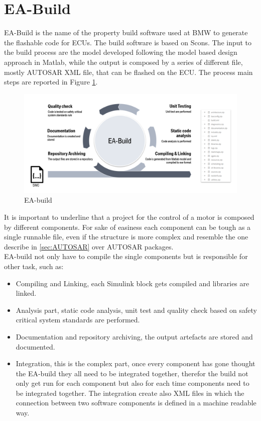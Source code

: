 \documentclass[../main.tex]{subfiles}
\begin{document}
\section{EA-Build}
\label{sec:EA-buildsection}
EA-Build is the name of the property build software used at BMW to generate the flashable code for ECUs. The build software is based on Scons. The input to the build process are the model developed following the model based design approach in Matlab, while the output is composed by a series of different file, mostly \gls{AUTOSAR} XML file, that can be flashed on the \gls{ECU}. The process main steps are reported in Figure \ref{fig:eabuild}.
\begin{figure}[h]
    \centering
    \includegraphics[width=\linewidth]{images_folder/build_proc.png}
    \caption{EA-build}
    \label{fig:eabuild}
\end{figure}
It is important to underline that a project for the control of a motor is composed by different components. For sake of easiness each component can be tough as a single runnable file, even if the structure is more complex and resemble the one describe in \ref{sec:AUTOSAR} over \gls{AUTOSAR} packages.\\
EA-build not only have to compile the single components but is responsible for other task, such as:
\begin{itemize}
    \item Compiling and Linking, each Simulink block gets compiled and libraries are linked.
    \item Analysis part, static code analysis, unit test and quality check based on safety critical system standards are performed.
    \item Documentation and repository archiving, the output artefacts are stored and documented.
    \item Integration, this is the complex part, once every component has gone thought the EA-build they all need to be integrated together, therefor the build not only get run for each component but also for each time components need to be integrated together. The integration create also XML files in which the connection between two software components is defined in a machine readable way.
\end{itemize}
\end{document}
